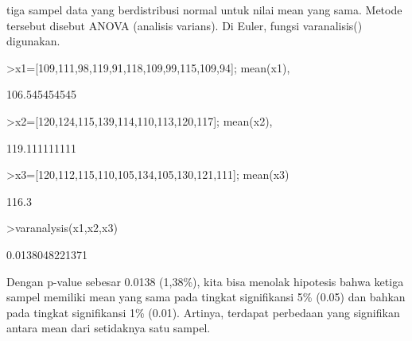 \documentclass[a4paper,10pt]{article}
\begin{document}
\begin{eulernotebook}
\begin{eulercomment}
\begin{eulercomment}
\begin{eulercomment}
\begin{eulercomment}
\begin{eulercomment}
tiga sampel data yang berdistribusi normal untuk nilai mean yang sama.
Metode tersebut disebut ANOVA (analisis varians). Di Euler, fungsi
varanalisis() digunakan.
\end{eulercomment}
\begin{eulerprompt}
>x1=[109,111,98,119,91,118,109,99,115,109,94]; mean(x1),
\end{eulerprompt}
\begin{euleroutput}
  106.545454545
\end{euleroutput}
\begin{eulerprompt}
>x2=[120,124,115,139,114,110,113,120,117]; mean(x2),
\end{eulerprompt}
\begin{euleroutput}
  119.111111111
\end{euleroutput}
\begin{eulerprompt}
>x3=[120,112,115,110,105,134,105,130,121,111]; mean(x3)
\end{eulerprompt}
\begin{euleroutput}
  116.3
\end{euleroutput}
\begin{eulerprompt}
>varanalysis(x1,x2,x3)
\end{eulerprompt}
\begin{euleroutput}
  0.0138048221371
\end{euleroutput}
\begin{eulercomment}
Dengan p-value sebesar 0.0138 (1,38\%), kita bisa menolak hipotesis
bahwa ketiga sampel memiliki mean yang sama pada tingkat signifikansi
5\% (0.05) dan bahkan pada tingkat signifikansi 1\% (0.01). Artinya,
terdapat perbedaan yang signifikan antara mean dari setidaknya satu
sampel.


\end{eulercomment}
\end{eulercomment}
\end{eulercomment}
\end{eulercomment}
\end{eulercomment}
\end{eulernotebook}
\end{document}
